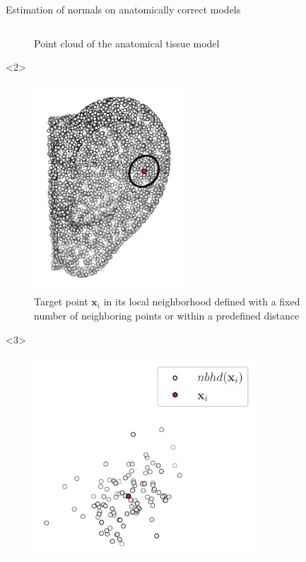 \documentclass[xcolor=dvipsnames,10pt]{beamer}
\begin{document}
\begin{frame}{Estimation of normals on anatomically correct models}
\begin{columns}[c]
\begin{column}{0.5\textwidth}
\begin{onlyenv}
\begin{center}
\begin{figure}
                    \caption{Point cloud of the anatomical tissue model}
                \end{figure}
                \end{center}
            \end{onlyenv}
            \begin{onlyenv}<2>
                \begin{center}
                \begin{figure}
                    \includegraphics[width=0.5\textwidth]{artwork/ear_pcd_xi.pdf}
                    \caption{Target point $\mathbf{x}_i$ in its local neighborhood defined with a fixed number of neighboring points or within a predefined distance}
                \end{figure}
                \end{center}
            \end{onlyenv}
            \begin{onlyenv}<3>
                \begin{center}
                \begin{figure}
                    \includegraphics[width=0.75\textwidth]{artwork/orthogonal_set_1.pdf}

\end{figure}
\end{center}
\end{onlyenv}
\end{column}
\end{columns}
\end{frame}
\end{document}
